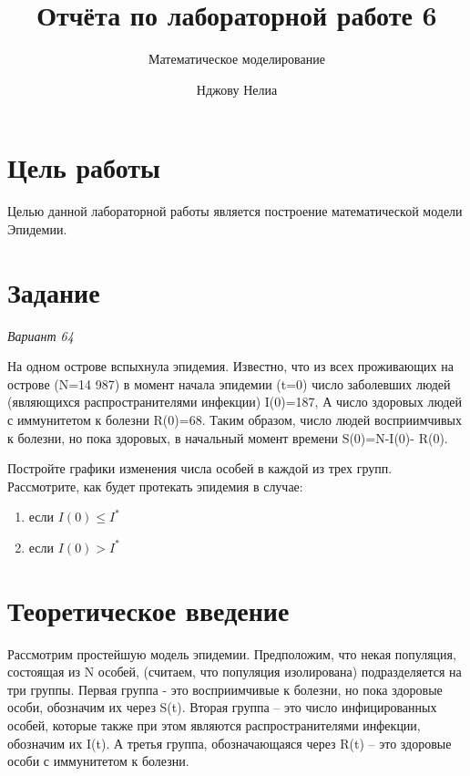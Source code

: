 \documentclass[
  12pt,
  a4paper,
  DIV=11,
  numbers=noendperiod]{scrreprt}
\title{Отчёта по лабораторной работе 6}
\subtitle{Математическое моделирование}
\author{Нджову Нелиа}
\date{}
\renewcommand*\contentsname{Содержание}
\newcommand\contentsname{Содержание}
\begin{document}
\maketitle

\renewcommand*\contentsname{Содержание}
{
\setcounter{tocdepth}{1}
\tableofcontents
}
\listoffigures
\listoftables
{}
\chapter{Цель
работы}\label{ux446ux435ux43bux44c-ux440ux430ux431ux43eux442ux44b}

Целью данной лабораторной работы является построение математической
модели Эпидемии.

\chapter{Задание}\label{ux437ux430ux434ux430ux43dux438ux435}

\emph{Вариант 64}

На одном острове вспыхнула эпидемия. Известно, что из всех проживающих
на острове (N=14 987) в момент начала эпидемии (t=0) число заболевших
людей (являющихся распространителями инфекции) I(0)=187, А число
здоровых людей с иммунитетом к болезни R(0)=68. Таким образом, число
людей восприимчивых к болезни, но пока здоровых, в начальный момент
времени S(0)=N-I(0)- R(0).

Постройте графики изменения числа особей в каждой из трех групп.
Рассмотрите, как будет протекать эпидемия в случае:

\begin{enumerate}
\def\labelenumi{\arabic{enumi})}
\item
  если \(I(0) \leq I^*\)
\item
  если \(I(0) > I^*\)
\end{enumerate}

\chapter{Теоретическое
введение}\label{ux442ux435ux43eux440ux435ux442ux438ux447ux435ux441ux43aux43eux435-ux432ux432ux435ux434ux435ux43dux438ux435}

Рассмотрим простейшую модель эпидемии. Предположим, что некая популяция,
состоящая из N особей, (считаем, что популяция изолирована)
подразделяется на три группы. Первая группа - это восприимчивые к
болезни, но пока здоровые особи, обозначим их через S(t). Вторая группа
-- это число инфицированных особей, которые также при этом являются
распространителями инфекции, обозначим их I(t). А третья группа,
обозначающаяся через R(t) -- это здоровые особи с иммунитетом к болезни.
\end{document}

